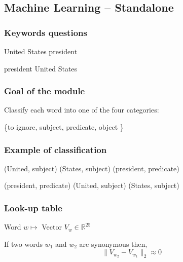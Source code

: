 \subsection{Machine Learning \--- Standalone}

\begin{frame}[fragile]
  \frametitle{Keywords questions}

	
	\begin{center}
  	United States president
	\end{center}

	\begin{center}
  	president United States
	\end{center}

\end{frame}

\begin{frame}[fragile]
\frametitle{Goal of the module}

\alert{Classify} each word into one of the four categories:

\begin{center}
 \{to ignore, subject, predicate, object \}
\end{center}

\end{frame}

\begin{frame}[fragile]
	\frametitle{Example of classification}

	\begin{center}
  	(United, subject) (States, subject) (president, predicate)
	\end{center}

	\begin{center}
  	(president, predicate) (United, subject) (States, subject)
	\end{center}



\end{frame}

\begin{frame}[fragile]
  \frametitle{Look-up table}

	\begin{center}
	Word $w \mapsto $ Vector $ V_w \in \mathbb{R}^{25}$
	\end{center}

	\begin{center}
	If two words $w_1$ and $w_2$ are \alert{synonymous} then, \newline
	$$ \| V_{w_2} - V_{w_1} \|_2 \approx 0 $$
	
	\end{center}



\end{frame}



